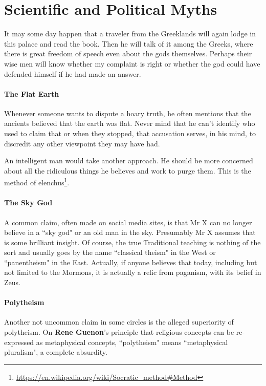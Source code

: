 \section{Scientific and Political Myths}

\begin{quotex}
It may some day happen that a traveler from the Greeklands will again lodge in this palace and read the book. Then he will talk of it among the Greeks, where there is great freedom of speech even about the gods themselves. Perhaps their wise men will know whether my complaint is right or whether the god could have defended himself if he had made an answer. 

\end{quotex}
\paragraph{The Flat Earth}
Whenever someone wants to dispute a hoary truth, he often mentions that the ancients believed that the earth was flat. Never mind that he can't identify who used to claim that or when they stopped, that accusation serves, in his mind, to discredit any other viewpoint they may have had.

An intelligent man would take another approach. He should be more concerned about all the ridiculous things he believes and work to purge them. This is the method of elenchus\footnote{\url{https://en.wikipedia.org/wiki/Socratic_method\#Method}}.

\paragraph{The Sky God}
A common claim, often made on social media sites, is that Mr X can no longer believe in a ``sky god" or an old man in the sky. Presumably Mr X assumes that is some brilliant insight. Of course, the true Traditional teaching is nothing of the sort and usually goes by the name ``classical theism" in the West or ``panentheism" in the East. Actually, if anyone believes that today, including but not limited to the Mormons, it is actually a relic from paganism, with its belief in Zeus.

\paragraph{Polytheism}
Another not uncommon claim in some circles is the alleged superiority of polytheism. On \textbf{Rene Guenon}'s principle that religious concepts can be re-expressed as metaphysical concepts, ``polytheism" means ``metaphysical pluralism", a complete absurdity.

